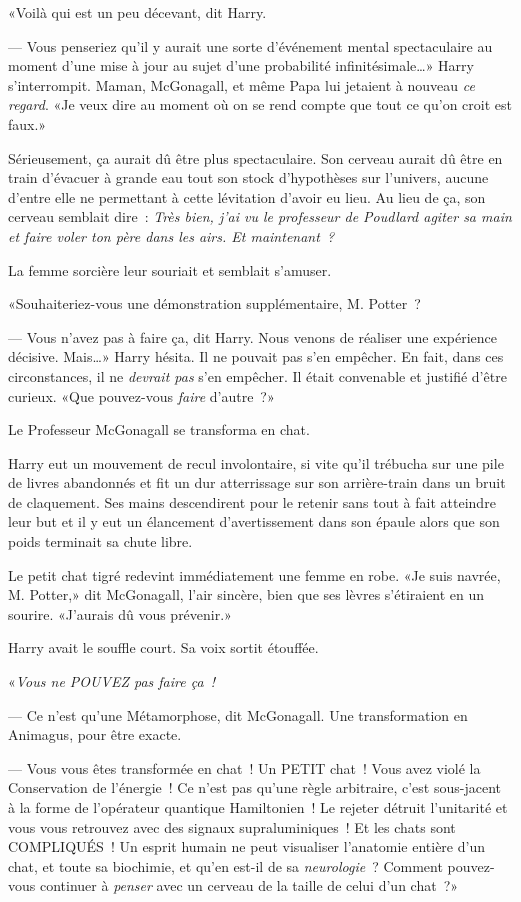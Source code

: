 «Voilà qui est un peu décevant, dit Harry.

--- Vous penseriez qu'il y aurait une sorte d'événement mental spectaculaire au moment d'une mise à jour au sujet d'une probabilité infinitésimale…» Harry s'interrompit. Maman, McGonagall, et même Papa lui jetaient à nouveau \emph{ce regard}. «Je veux dire au moment où on se rend compte que tout ce qu'on croit est faux.»

Sérieusement, ça aurait dû être plus spectaculaire. Son cerveau aurait dû être en train d'évacuer à grande eau tout son stock d'hypothèses sur l'univers, aucune d'entre elle ne permettant à cette lévitation d'avoir eu lieu. Au lieu de ça, son cerveau semblait dire~: \emph{Très bien, j'ai vu le professeur de Poudlard agiter sa main et faire voler ton père dans les airs. Et maintenant~?}

La femme sorcière leur souriait et semblait s'amuser.

«Souhaiteriez-vous une démonstration supplémentaire, M. Potter~?

--- Vous n'avez pas à faire ça, dit Harry. Nous venons de réaliser une expérience décisive. Mais…» Harry hésita. Il ne pouvait pas s'en empêcher. En fait, dans ces circonstances, il ne \emph{devrait pas} s'en empêcher. Il était convenable et justifié d'être curieux. «Que pouvez-vous \emph{faire} d'autre~?»

Le Professeur McGonagall se transforma en chat.

Harry eut un mouvement de recul involontaire, si vite qu'il trébucha sur une pile de livres abandonnés et fit un dur atterrissage sur son arrière-train dans un bruit de claquement. Ses mains descendirent pour le retenir sans tout à fait atteindre leur but et il y eut un élancement d'avertissement dans son épaule alors que son poids terminait sa chute libre.

Le petit chat tigré redevint immédiatement une femme en robe. «Je suis navrée, M. Potter,» dit McGonagall, l'air sincère, bien que ses lèvres s'étiraient en un sourire. «J'aurais dû vous prévenir.»

Harry avait le souffle court. Sa voix sortit étouffée.

«\emph{Vous ne POUVEZ pas faire ça~!}

--- Ce n'est qu'une Métamorphose, dit McGonagall. Une transformation en Animagus, pour être exacte.

--- Vous vous êtes transformée en chat~! Un PETIT chat~! Vous avez violé la Conservation de l'énergie~! Ce n'est pas qu'une règle arbitraire, c'est sous-jacent à la forme de l'opérateur quantique Hamiltonien~! Le rejeter détruit l'unitarité et vous vous retrouvez avec des signaux supraluminiques~! Et les chats sont COMPLIQUÉS~! Un esprit humain ne peut visualiser l'anatomie entière d'un chat, et toute sa biochimie, et qu'en est-il de sa \emph{neurologie}~? Comment pouvez-vous continuer à \emph{penser} avec un cerveau de la taille de celui d'un chat~?»

